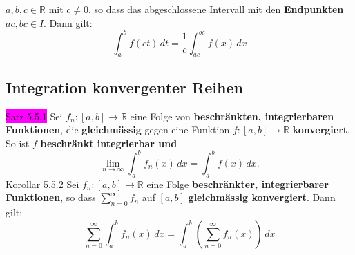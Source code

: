 \documentclass[landscape, 10pt]{article}
\newcommand{\R}{\mathbb{R}}
\begin{document}
\begin{multicols}{3}
{                            $a,b,c\in\R$} mit 
                            \textcolor{NavyBlue}{$c\neq0$}, 
                            so dass das abgeschlossene 
                            Intervall mit den 
                            \textbf{Endpunkten} \\
                            \textcolor{NavyBlue}{$ac,bc\in I$}. 
                            Dann gilt: 
                            \begin{equation*}
                                   \int_a^bf(ct)\,dt
                                   =\frac{1}{c}
                                   \int_{ac}^{bc}f(x)\,dx
                            \end{equation*}
       \subsection{Integration konvergenter Reihen}
              \colorbox{magenta}{Satz 5.5.1} 
                     Sei \textcolor{NavyBlue}{
                     $f_n:[a,b]\longrightarrow\R$} 
                     eine Folge von \textbf{beschränkten, 
                     integrierbaren Funktionen}, 
                     die \textbf{gleichmässig} gegen 
                     eine Funktion 
                     \textcolor{NavyBlue}{
                     $f:[a,b]\longrightarrow\R$} 
                     \textbf{konvergiert}.
                     So ist \textcolor{NavyBlue}{$f$} 
                     \textbf{beschränkt integrierbar und} 
                     \begin{equation*}
                            \lim\limits_{n\to\infty}\int_a^bf_n(x)\,dx
                            =\int_a^bf(x)\,dx.
                     \end{equation*}
              \colorbox{BurntOrange}{Korollar 5.5.2} 
                     Sei \textcolor{NavyBlue}{
                     $f_n:[a,b]\longrightarrow\R$} eine Folge 
                     \textbf{beschränkter, integrierbarer 
                     Funktionen}, so dass 
                     \textcolor{NavyBlue}{
                     $\sum_{n=0}^\infty f_n$} auf 
                     \textcolor{NavyBlue}{$[a,b]$}
                     \textbf{gleichmässig konvergiert}. 
                     Dann gilt: 
                     \begin{equation*}
                           \sum_{n=0}^\infty\int_a^bf_n(x)\,dx
                            =\int_a^b(\sum_{n=0}^
                            \infty f_n(x))\,dx 
                     \end{equation*}

\end{multicols}
\end{document}
